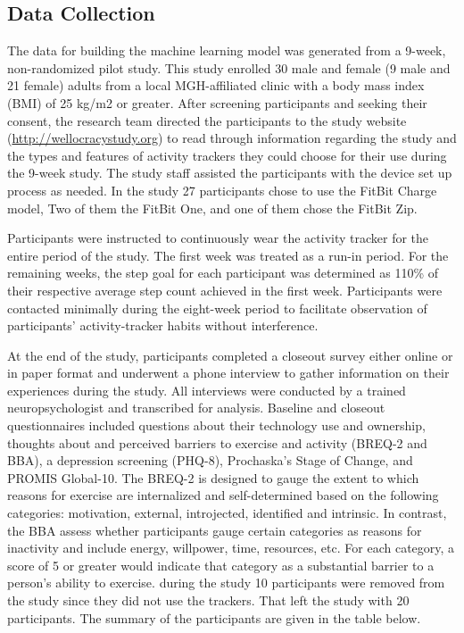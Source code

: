 \documentclass[preprint,12pt]{elsarticle}
\begin{document}
\subsection{Data Collection}
The data for building the machine learning model was generated from a 9-week, non-randomized pilot study. This study enrolled 30 male and female (9 male and 21 female) adults from a local MGH-affiliated clinic with a body mass index (BMI) of 25 kg/m2 or greater. After screening participants and seeking their consent, the research team directed the participants to the study website (\url{http://wellocracystudy.org}) to read through information regarding the study and the types and features of activity trackers they could choose for their use during the 9-week study. The study staff assisted the participants with the device set up process as needed. In the study 27 participants chose to use the FitBit Charge model, Two of them the FitBit One, and one of them chose the FitBit Zip. 

\par
Participants were instructed to continuously wear the activity tracker for the entire period of the study. The first week was treated as a run-in period. For the remaining weeks, the step goal for each participant was determined as 110\% of their respective average step count achieved in the first week. Participants were contacted minimally during the eight-week period to facilitate observation of participants’ activity-tracker habits without interference. 
\par
At the end of the study, participants completed a closeout survey either online or in paper format and underwent a phone interview to gather information on their experiences during the study. All interviews were conducted by a trained neuropsychologist and transcribed for analysis. Baseline and closeout questionnaires included questions about their technology use and ownership, thoughts about and perceived barriers to exercise and activity (BREQ-2 and BBA), a depression screening (PHQ-8), Prochaska’s Stage of Change, and PROMIS Global-10. The BREQ-2 is designed to gauge the extent to which reasons for exercise are internalized and self-determined based on the following categories: motivation, external, introjected, identified and intrinsic. In contrast, the BBA assess whether participants gauge certain categories as reasons for inactivity and include energy, willpower, time, resources, etc. For each category, a score of 5 or greater would indicate that category as a substantial barrier to a person’s ability to exercise. during the study 10 participants were removed from the study since they did not use the trackers. That left the study with 20 participants. The summary of the participants are given in the table below.
\end{document}
